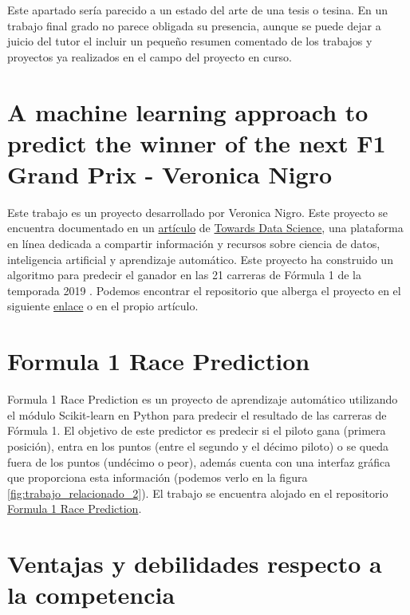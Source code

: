 
Este apartado sería parecido a un estado del arte de una tesis o tesina. En un trabajo final grado no parece obligada su presencia, aunque se puede dejar a juicio del tutor el incluir un pequeño resumen comentado de los trabajos y proyectos ya realizados en el campo del proyecto en curso. 

\section{A machine learning approach to predict the winner of the next F1 Grand Prix - Veronica Nigro}
Este trabajo es un proyecto desarrollado por Veronica Nigro. Este proyecto se encuentra documentado en un \href{https://towardsdatascience.com/formula-1-race-predictor-5d4bfae887da}{artículo} de \href{https://towardsdatascience.com/}{Towards Data Science}, una plataforma en línea dedicada a compartir información y recursos sobre ciencia de datos, inteligencia artificial y aprendizaje automático. Este proyecto ha construido un algoritmo para predecir el ganador en las 21 carreras de Fórmula 1 de la temporada 2019 \cite{towardsdatascience:f1veronigro}. Podemos encontrar el repositorio que alberga el proyecto en el siguiente \href{https://github.com/veronicanigro/Formula_1/blob/master/README.md}{enlace} o en el propio artículo. 


\section{Formula 1 Race Prediction}
Formula 1 Race Prediction es un proyecto de aprendizaje automático utilizando el módulo Scikit-learn en Python para predecir el resultado de las carreras de Fórmula 1. El objetivo de este predictor es predecir si el piloto gana (primera posición), entra en los puntos (entre el segundo y el décimo piloto) o se queda fuera de los puntos (undécimo o peor), además cuenta con una interfaz gráfica que proporciona esta información (podemos verlo en la figura \ref{fig:trabajo_relacionado_2}). El trabajo se encuentra alojado en el repositorio \href{https://github.com/Sloopy3333/Formula-1-Prediction}{Formula 1 Race Prediction}.


\section{Ventajas y debilidades respecto a la competencia}

